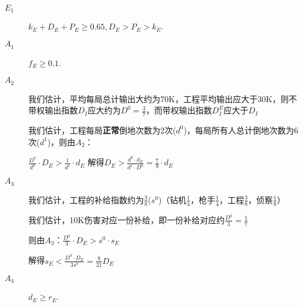 \documentclass{ctexart}
\begin{document}
\begin{description}
    \item[$E_1$] $k_E + D_E + P_E \ge 0.65, D_E > P_E > k_E$.
    \item[$A_1$] $f_E \ge 0.1$.
    \item[$A_2$]  我们估计，平均每局总计输出大约为70K，工程平均输出应大于30K，则不带权输出指数$D_I$应大约为$D^0 = \frac{3}{7}$，而带权输出指数$D^E_I$应大于$D_I$

          我们估计，工程每局\textbf{正常}倒地次数为2次($d^0$)，每局所有人总计倒地次数为6次($d^1$)，则由$A_2$：

          $\frac{D^0}{d^0} \cdot D_E> \frac{1}{d^1} \cdot d_E$
          解得$D_E > \frac{d^0 \cdot d_E}{d^1 \cdot D^0} = \frac{7}{9} \cdot d_E$
    \item[$A_3$] 我们估计，工程的补给指数约为$\frac{3}{8}$($s^0$)（钻机$\frac{1}{4}$，枪手$\frac{1}{4}$，工程$\frac{3}{8}$，侦察$\frac{1}{8}$）

          我们估计，10K伤害对应一份补给，即一份补给对应约$\frac{D^0}{3} = \frac{1}{7}$

          则由$A_3$：$\frac{D^0}{3} \cdot D_E > s^0 \cdot s_E$

          解得$s_E < \frac{D^0 \cdot D_E}{3 s^0} = \frac{8}{21} D_E$

    \item[$A_4$] $d_E \ge r_E$.
\end{description}
\end{document}
